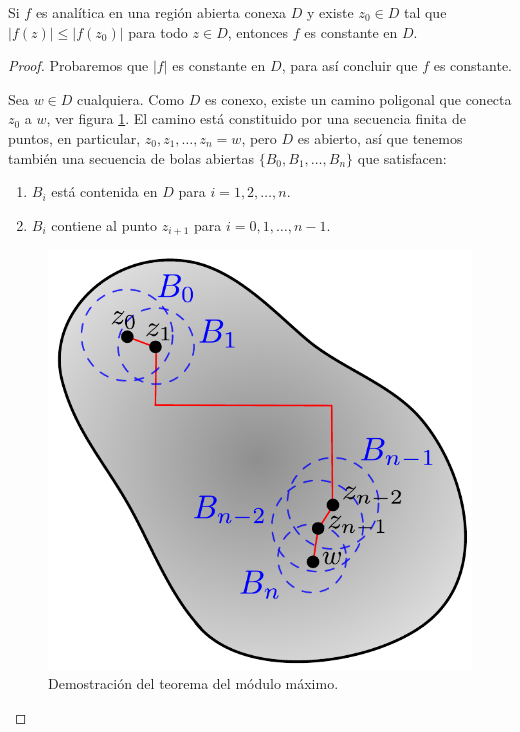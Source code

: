 \begin{teorema}
Si $f$ es analítica en una región abierta conexa $D$ y existe $z_0 \in D$ tal que $|f(z)| \leq |f(z_0)|$ para todo $z \in D$, entonces $f$ es constante en $D$.
\end{teorema}

\begin{proof}
Probaremos que $|f|$ es constante en $D$, para así concluir que $f$ es constante.

Sea $w \in D$ cualquiera. Como $D$ es conexo, existe un camino poligonal que conecta $z_0$ a $w$, ver figura \ref{fig:ModuloMaximo}. El camino está constituido por una secuencia finita de puntos, en particular, $z_0,z_1, \dots, z_n = w$, pero $D$ es abierto, así que tenemos también una secuencia de bolas abiertas $\{B_0, B_1, \dots, B_n\}$ que satisfacen:
\begin{enumerate}
    \item $B_i$ está contenida en $D$ para $i = 1,2, \dots,n$.
    
    \item $B_i$ contiene al punto $z_{i+1}$ para $i = 0,1, \dots, n-1$.
\end{enumerate}

\begin{figure}[H]
    \centering
    \includegraphics[scale = 0.53]{Figuras/ModuloMaximo.pdf}
    \caption{Demostración del teorema del módulo máximo.}
    \label{fig:ModuloMaximo}
\end{figure}


\end{proof}
